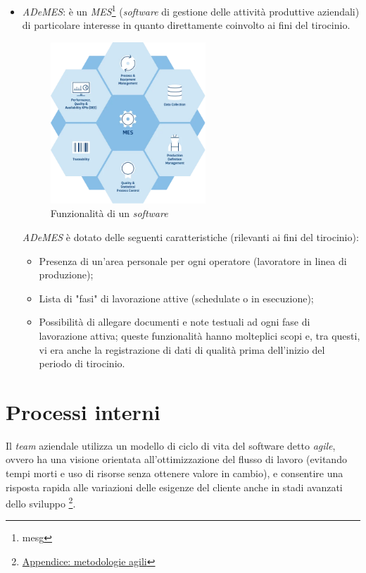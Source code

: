 \begin{itemize}
    \item \textit{ADeMES}: è un \textit{MES}\footnote{\gls{mesg}} (\textit{software} di gestione delle attività produttive aziendali) di particolare interesse in quanto direttamente coinvolto ai fini del tirocinio.
    \begin{figure}[H]
        \centering
        \includegraphics[width=0.55\textwidth]{images/mes.png}
        \caption[Funzionalità di un \textit{software MES}]{Funzionalità di un \textit{software } \footnotemark}
    \end{figure}
    {}

    \textit{ADeMES} è dotato delle seguenti caratteristiche (rilevanti ai fini del tirocinio):
    \begin{itemize}
        \item Presenza di un'area personale per ogni operatore (lavoratore in linea di produzione);
        \item Lista di "fasi" di lavorazione attive (schedulate o in esecuzione);
        \item Possibilità di allegare documenti e note testuali ad ogni fase di lavorazione attiva; queste funzionalità hanno molteplici scopi e, tra questi, vi era anche la registrazione di dati di qualità prima dell'inizio del periodo di tirocinio.
    \end{itemize}
\end{itemize}

\section{Processi interni}

Il \textit{team} aziendale utilizza un modello di ciclo di vita del software detto \textit{agile}, ovvero ha una visione orientata all'ottimizzazione del flusso di lavoro (evitando tempi morti e uso di risorse senza ottenere valore in cambio), 
e consentire una risposta rapida alle variazioni delle esigenze del cliente anche in stadi avanzati dello sviluppo \footnote{\hyperref[app:agile]{Appendice: metodologie agili}}.

